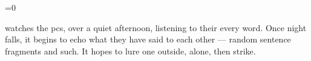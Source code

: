 \ifnum\value{temperature}=0


 watches the \glspl{pc}, over a quiet afternoon, listening to their every word.
Once night falls, it begins to echo what they have said to each other --- random sentence fragments and such.
It hopes to lure one outside, alone, then strike.


\fi

